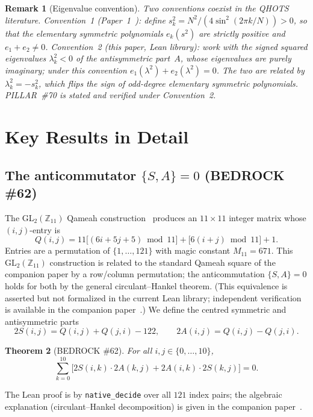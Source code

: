 \documentclass[11pt,a4paper]{article}
\newtheorem{theorem}{Theorem}
\newtheorem{remark}[theorem]{Remark}
\begin{document}
\begin{remark}[Eigenvalue convention]\label{rem:convention}
Two conventions coexist in the QHOTS literature.
\emph{Convention~1} (Paper~1~\cite{qhots_v69}): define $s_k^2 = N^2/(4\sin^2(2\pi k/N)) > 0$,
so that the elementary symmetric polynomials $e_k(s^2)$ are strictly positive
and $e_1 + e_2 \neq 0$.
\emph{Convention~2} (this paper, Lean library): work with the \emph{signed}
squared eigenvalues $\lambda_k^2 < 0$ of the antisymmetric part~$A$, whose
eigenvalues are purely imaginary; under this convention $e_1(\lambda^2) + e_2(\lambda^2) = 0$.
The two are related by $\lambda_k^2 = -s_k^2$, which flips the sign of
odd-degree elementary symmetric polynomials.
PILLAR~\#70 is stated and verified under Convention~2.
\end{remark}

\section{Key Results in Detail}
\label{sec:results}

\subsection{The anticommutator $\{S,A\}=0$ (BEDROCK \#62)}

The GL$_2(\mathbb{Z}_{11})$ Qameah construction~\cite{siamese_magic} produces an $11\times 11$
integer matrix whose $(i,j)$-entry is
\[
  Q(i,j) = 11\bigl[(6i+5j+5)\bmod 11\bigr] + \bigl[6(i+j)\bmod 11\bigr] + 1.
\]
Entries are a permutation of $\{1,\ldots,121\}$ with magic constant
$M_{11}=671$.  This $\mathrm{GL}_2(\mathbb{Z}_{11})$ construction is
related to the standard Qameah square of the companion paper by a
row/column permutation; the anticommutation $\{S,A\}=0$ holds for both
by the general circulant--Hankel theorem.  (This equivalence is asserted
but not formalized in the current Lean library; independent verification
is available in the companion paper~\cite{qhots_v69}.)
We define the centred symmetric and antisymmetric parts
\[
  2S(i,j) = Q(i,j)+Q(j,i)-122, \qquad 2A(i,j)=Q(i,j)-Q(j,i).
\]
\begin{theorem}[BEDROCK \#62]
For all $i,j\in\{0,\ldots,10\}$,
\[
  \sum_{k=0}^{10}\bigl[2S(i,k)\cdot 2A(k,j)+2A(i,k)\cdot 2S(k,j)\bigr]=0.
\]
\end{theorem}
The Lean proof is by \texttt{native\_decide} over all $121$ index pairs;
the algebraic explanation (circulant--Hankel decomposition) is given in
the companion paper~\cite{qhots_v69}.
\end{document}
